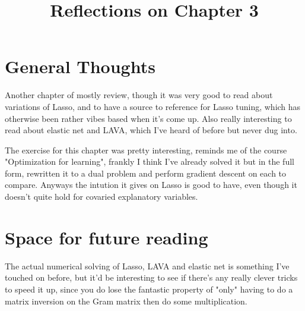 \documentclass[10pt, english]{article}
\begin{document}
\title{Reflections on Chapter 3}
\date{}
\author{}

\maketitle


\section*{General Thoughts}
Another chapter of mostly review, though it was very good to read about variations of Lasso,
and to have a source to reference for Lasso tuning, which has otherwise been rather vibes based 
when it's come up. Also really interesting to read about elastic net and LAVA, which I've heard of 
before but never dug into.

The exercise for this chapter was pretty interesting, reminds me 
of the course "Optimization for learning", frankly I think I've already solved it 
but in the full form, rewritten it to a dual problem and perform gradient descent on each to compare.
Anyways the intution it gives on Lasso is good to have, even though it doesn't quite hold for covaried 
explanatory variables.

\section*{Space for future reading}
The actual numerical solving of Lasso, LAVA and elastic net is something I've touched on before, but 
it'd be interesting to see if there's any really clever tricks to speed it up, since you do lose
the fantastic property of "only" having to do a matrix inversion on the Gram matrix then do some multiplication.
\end{document}
